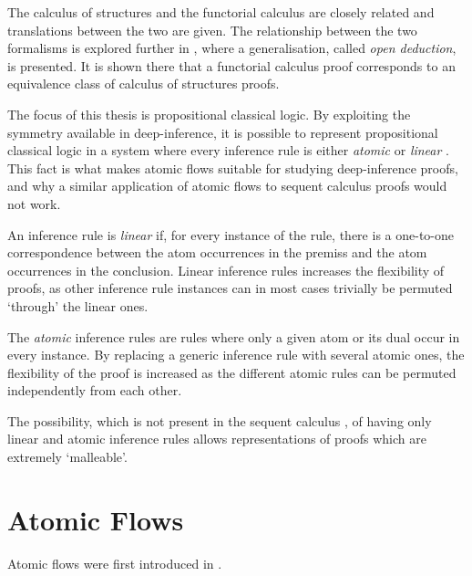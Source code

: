 The calculus of structures and the functorial calculus are closely related and translations between the two are given. The relationship between the two formalisms is explored further in \cite{GuglGundPari::A-Proof-:fk}, where a generalisation, called \emph{open deduction}, is presented. It is shown there that a functorial calculus proof corresponds to an equivalence class of calculus of structures proofs.

The focus of this thesis is propositional classical logic. By exploiting the symmetry available in deep-inference, it is possible to represent propositional classical logic in a system where every inference rule is either \emph{atomic} or \emph{linear} \cite{BrunTiu:01:A-Local-:mz}. This fact is what makes atomic flows suitable for studying deep-inference proofs, and why a similar application of atomic flows to sequent calculus proofs would not work.

An inference rule is \emph{linear} if, for every instance of the rule, there is a one-to-one correspondence between the atom occurrences in the premiss and the atom occurrences in the conclusion. Linear inference rules increases the flexibility of proofs, as other inference rule instances can in most cases trivially be permuted `through' the linear ones.

The \emph{atomic} inference rules are rules where only a given atom or its dual occur in every instance. By replacing a generic inference rule with several atomic ones, the flexibility of the proof is increased as the different atomic rules can be permuted independently from each other.

The possibility, which is not present in the sequent calculus \cite{Brun:03:Two-Rest:mn}, of having only linear and atomic inference rules allows representations of proofs which are extremely `malleable'.

\section{Atomic Flows}

% 
% 

Atomic flows were first introduced in \cite{GuglGund:07:Normalis:lr}.

